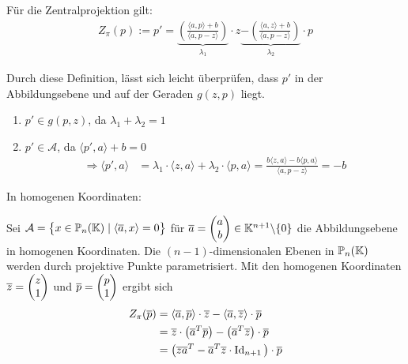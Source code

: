   \begin{thm}
    Für die Zentralprojektion gilt:
    \begin{align*}
      Z_\pi(p) := p' = \underbrace{ \left( \frac{\langle a,p \rangle + b }{\langle a,p-z \rangle} \right) }_{ \lambda_1} \cdot z  
                       \underbrace{-\left( \frac{\langle a,z \rangle + b }{\langle a,p-z \rangle} \right) }_{ \lambda_2} \cdot p
    \end{align*}
  \end{thm}

  \begin{bem}
  Durch diese Definition, lässt sich leicht überprüfen, dass $p'$ in der Abbildungsebene und auf der Geraden $g(z,p)$ liegt. 
    \begin{enumerate}
      \item $p'\in g(p,z)$, da $\lambda_1 + \lambda_2 = 1$
      \item $p'\in \mathcal{A}$, da $\langle p',a \rangle +b = 0$
            \begin{align*}
              \Rightarrow \langle p',a \rangle & = \lambda_1 \cdot \langle z,a \rangle + \lambda_2 \cdot \langle p,a \rangle 
                                                 = \frac{b\langle z,a \rangle - b\langle p,a \rangle}{\langle a,p-z \rangle} 
                                                 = -b
            \end{align*}
    \end{enumerate}
  \end{bem}

  In homogenen Koordinaten: \par

  Sei $\mathcal{A} = \big\{ x \in \mathbb{P}_n(\mathbb K) \mid \langle \overline{a},x \rangle = 0 \big\}$ für $\overline{a}=\begin{pmatrix}{a}\\{b}\end{pmatrix} \in \mathbb K^{n+1}\backslash\{0\}$ die 
  Abbildungsebene in homogenen Koordinaten. Die $(n-1)$-dimensionalen Ebenen in $\mathbb{P}_n(\mathbb K)$ werden durch projektive Punkte parametrisiert. Mit den homogenen 
  Koordinaten $\overline{z}=\begin{pmatrix}{z}\\{1}\end{pmatrix}$ und $\overline{p}=\begin{pmatrix}{p}\\{1}\end{pmatrix}$ ergibt sich
  \begin{align*}
    Z_\pi(\overline{p}) & = \langle \overline{a},\overline{p} \rangle \cdot \overline{z} - \langle \overline{a},\overline{z} \rangle \cdot \overline{p} \\
                        & = \overline{z} \cdot \big( \overline{a}^T \overline{p} \big) - \big( \overline{a}^T \overline{z} \big) \cdot \overline{p} \\
                        & = \big( \overline{z}\overline{a}^T - \overline{a}^T\overline{z} \cdot \operatorname{Id}_{n+1} \big) \cdot \overline{p}
  \end{align*}


